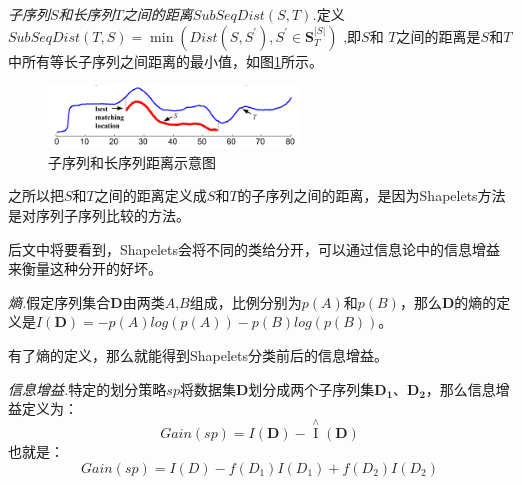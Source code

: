 \begin{mydef}
\emph{子序列$S$和长序列$T$之间的距离$SubSeqDist(S,T)$.}定义$SubSeqDist\left( {T,S} \right) = \min \left( {Dist\left( {S,{S^{'}}} \right),{S^{'}} \in \bm{S}_T^{\left| S \right|}} \right)$ ,即$S$和 $T$之间的距离是$S$和$T$中所有等长子序列之间距离的最小值，如图\ref{fig:14}所示。
\end{mydef}

\begin{figure}[h]
  \centering
  \includegraphics[width=0.6\textwidth]{./figure/subdist.PNG}
  \caption{子序列和长序列距离示意图}\label{fig:14}
\end{figure}

之所以把$S$和$T$之间的距离定义成$S$和$T$的子序列之间的距离，是因为Shapelets方法是对序列子序列比较的方法。

后文中将要看到，Shapelets会将不同的类给分开，可以通过信息论中的信息增益来衡量这种分开的好坏。

\begin{mydef}
\emph{熵.}假定序列集合$\bm{D}$由两类$A$,$B$组成，比例分别为$p(A)$和$p(B)$，那么$\bm{D}$的熵的定义是$I(\bm{D}) = -p(A)log(p(A))-p(B)log(p(B))$。
\end{mydef}

有了熵的定义，那么就能得到Shapelets分类前后的信息增益。

\begin{mydef}
    \emph{信息增益.}特定的划分策略$sp$将数据集$\bm{D}$划分成两个子序列集$\bm{D_1}$、$\bm{D_2}$，那么信息增益定义为：
    \begin{equation}\label{equ:10}
      Gain\left( {sp} \right) = I\left( \bm{D} \right) - \mathop I\limits^ \wedge  \left( \bm{D} \right)
    \end{equation}
    也就是：
    \begin{equation}\label{equ:11}
      Gain\left( {sp} \right) = I\left( D \right) - f\left( {{D_1}} \right)I\left( {{D_1}} \right) + f\left( {{D_2}} \right)I\left( {{D_2}} \right)
    \end{equation}
\end{mydef}

